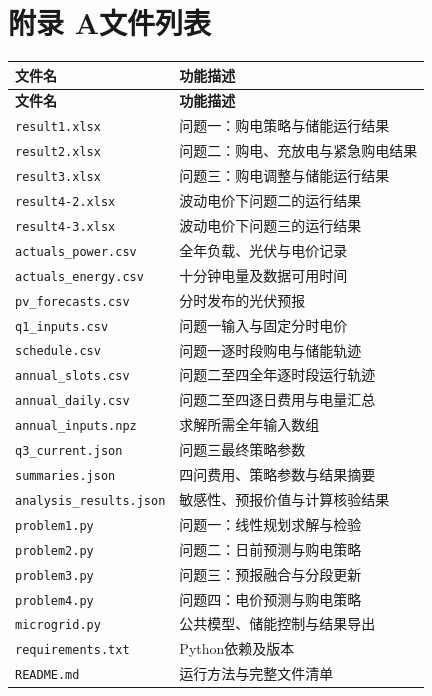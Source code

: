 \clearpage
\begingroup
\section*{附录 A\quad 文件列表}
\begingroup\small\setlength{\tabcolsep}{8pt}\renewcommand{\arraystretch}{1.12}
\begin{longtable}{@{}p{}p{}@{}}
\toprule \textbf{文件名} & \textbf{功能描述} \\ \midrule\endfirsthead
\toprule \textbf{文件名} & \textbf{功能描述} \\ \midrule\endhead
\bottomrule\endfoot
\nolinkurl{result1.xlsx} & 问题一：购电策略与储能运行结果 \\
\nolinkurl{result2.xlsx} & 问题二：购电、充放电与紧急购电结果 \\
\nolinkurl{result3.xlsx} & 问题三：购电调整与储能运行结果 \\
\nolinkurl{result4-2.xlsx} & 波动电价下问题二的运行结果 \\
\nolinkurl{result4-3.xlsx} & 波动电价下问题三的运行结果 \\
\addlinespace[4pt]
\nolinkurl{actuals_power.csv} & 全年负载、光伏与电价记录 \\
\nolinkurl{actuals_energy.csv} & 十分钟电量及数据可用时间 \\
\nolinkurl{pv_forecasts.csv} & 分时发布的光伏预报 \\
\nolinkurl{q1_inputs.csv} & 问题一输入与固定分时电价 \\
\nolinkurl{schedule.csv} & 问题一逐时段购电与储能轨迹 \\
\nolinkurl{annual_slots.csv} & 问题二至四全年逐时段运行轨迹 \\
\nolinkurl{annual_daily.csv} & 问题二至四逐日费用与电量汇总 \\
\addlinespace[4pt]
\nolinkurl{annual_inputs.npz} & 求解所需全年输入数组 \\
\addlinespace[4pt]
\nolinkurl{q3_current.json} & 问题三最终策略参数 \\
\nolinkurl{summaries.json} & 四问费用、策略参数与结果摘要 \\
\nolinkurl{analysis_results.json} & 敏感性、预报价值与计算核验结果 \\
\addlinespace[4pt]
\nolinkurl{problem1.py} & 问题一：线性规划求解与检验 \\
\nolinkurl{problem2.py} & 问题二：日前预测与购电策略 \\
\nolinkurl{problem3.py} & 问题三：预报融合与分段更新 \\
\nolinkurl{problem4.py} & 问题四：电价预测与购电策略 \\
\nolinkurl{microgrid.py} & 公共模型、储能控制与结果导出 \\
\addlinespace[4pt]
\nolinkurl{requirements.txt} & Python依赖及版本 \\
\addlinespace[4pt]
\nolinkurl{README.md} & 运行方法与完整文件清单 \\
\end{longtable}\endgroup
\clearpage
